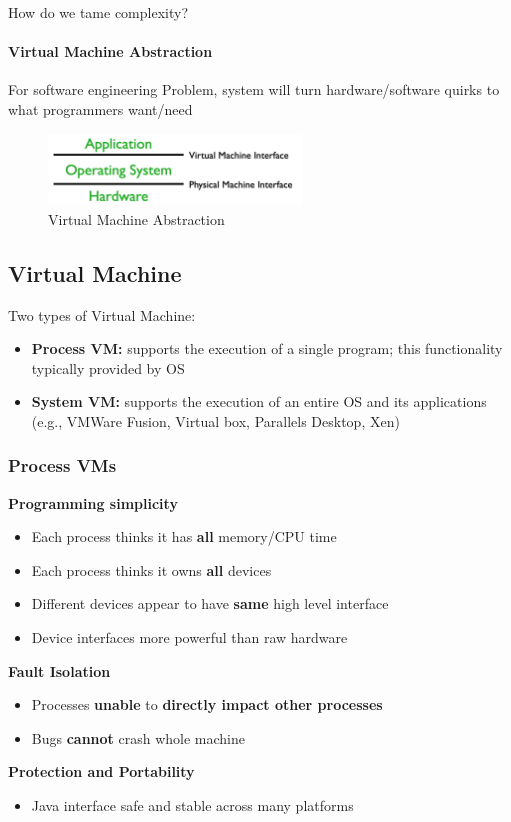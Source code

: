 \begin{tcolorbox}
\begin{discussion}
How do we tame complexity?
\end{discussion}
\paragraph{Virtual Machine Abstraction} For software engineering Problem, system will turn hardware/software quirks to what programmers want/need
\begin{figure}[H]
    \centering
    \includegraphics[width = 0.6\textwidth ]{figures/vma.jpg}
    \caption{Virtual Machine Abstraction}
\end{figure}
\end{tcolorbox}

\subsection{Virtual Machine}
Two types of Virtual Machine:
\begin{itemize}
    \item \textbf{Process VM:} supports the execution of a single program; this functionality typically provided by OS
\item \textbf{System VM:} supports the execution of an entire OS and its applications (e.g.,
VMWare Fusion, Virtual box, Parallels Desktop, Xen)
\end{itemize}

\subsubsection{Process VMs}
\textbf{Programming simplicity}
\begin{itemize}
    \item Each process thinks it has \textbf{all} memory/CPU time
    \item Each process thinks it owns \textbf{all} devices
    \item Different devices appear to have \textbf{same} high level interface
    \item Device interfaces more powerful than raw hardware
\end{itemize}
\textbf{Fault Isolation}
\begin{itemize}
    \item Processes \textbf{unable} to\textbf{ directly impact other processes}
    \item Bugs \textbf{cannot} crash whole machine
\end{itemize}
\textbf{Protection and Portability}
\begin{itemize}
    \item Java interface safe and stable across many platforms
\end{itemize}

